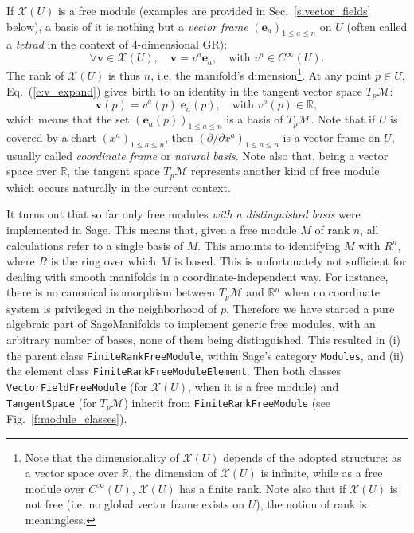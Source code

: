 \documentclass[a4paper]{jpconf}
\newcommand{\soft}[1]{\textsf{#1}}
\newcommand{\code}[1]{\texttt{#1}}
\newcommand{\Sage}{\soft{Sage}}
\newcommand{\SM}{\soft{SageManifolds}}
\newcommand{\be}{\begin{equation}}
\newcommand{\ee}{\end{equation}}
\newcommand{\w}[1]{\bm{#1}}
\begin{document}
If $\mathscr{X}(U)$ is a free module (examples are provided in Sec.~\ref{s:vector_fields} below),
a basis of it is nothing but a \emph{vector frame}
$(\w{e}_a)_{1\leq a \leq n}$ on $U$
(often called a \emph{tetrad} in the context of 4-dimensional GR):
\be \label{e:v_expand}
    \forall \w{v}\in\mathscr{X}(U),\quad \w{v} = v^a \w{e}_a,\quad\mbox{with\ } v^a \in C^\infty(U) .
\ee
The rank of $\mathscr{X}(U)$ is thus $n$, i.e. the manifold's 
dimension\footnote{Note that the dimensionality of $\mathscr{X}(U)$ depends
of the adopted structure: as a vector space over $\mathbb{R}$, the
dimension of $\mathscr{X}(U)$ is infinite, while as a free module over
$C^\infty(U)$, $\mathscr{X}(U)$ has a finite rank. Note also that if $\mathscr{X}(U)$
is not free (i.e. no global vector frame exists on $U$), the notion of rank 
is meaningless.}.
At any point $p\in U$, Eq.~(\ref{e:v_expand}) gives birth to an identity in 
the tangent vector space $T_p \mathcal{M}$:
\be 
    \w{v}(p) = v^a(p)  \; \w{e}_a(p),\quad\mbox{with\ } v^a(p) \in \mathbb{R} , 
\ee
which means that 
the set $(\w{e}_a(p))_{1\leq a \leq n}$ is a basis of $T_p \mathcal{M}$.
Note that if $U$ is covered by a chart $(x^a)_{1\leq a \leq n}$,
then $(\partial/\partial x^a)_{1\leq a \leq n}$
is a vector frame on $U$, usually called \emph{coordinate frame}
or \emph{natural basis}. Note also that, being a
vector space over $\mathbb{R}$, the tangent space $T_p \mathcal{M}$
represents another kind of free module which occurs naturally in the
current context. 


It turns out that so far only free modules \emph{with a distinguished basis} were 
implemented in \Sage{}. This means that, given a free module $M$ of rank $n$, 
all calculations refer to a single basis of $M$. This amounts to identifying
$M$ with $R^n$, where $R$ is the ring over which $M$ is based. 
This is unfortunately not sufficient for dealing with smooth manifolds in a
coordinate-independent way. 
For instance, there is no canonical 
isomorphism between $T_p\mathcal{M}$ and $\mathbb{R}^n$ when no coordinate
system is privileged in the neighborhood of $p$.
Therefore we have started a pure algebraic part of \SM{} to implement
generic free modules, with an arbitrary number of bases, 
none of them being distinguished. This resulted in (i) the parent class 
\code{FiniteRankFreeModule}, within \Sage{}'s category \code{Modules}, and (ii)
the element class 
\code{FiniteRankFreeModuleElement}. Then both classes
\code{VectorFieldFreeModule} (for $\mathscr{X}(U)$, when it is 
a free module) and \code{TangentSpace} (for $T_p\mathcal{M}$)
inherit from \code{FiniteRankFreeModule} (see Fig.~\ref{f:module_classes}). 
\end{document}
